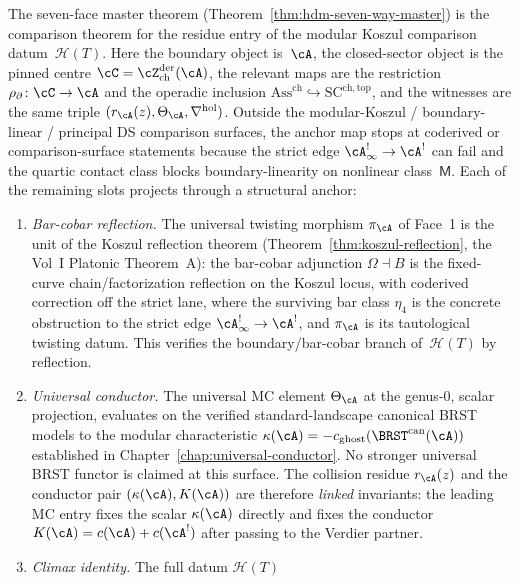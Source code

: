 \begin{remark}
\label{rem:hdm-anchors}
The seven-face master theorem
(Theorem~\ref{thm:hdm-seven-way-master}) is the comparison theorem for
the residue entry of the modular Koszul comparison
datum~$\mathcal{H}(T)$. Here the boundary object is~$\cA$, the
closed-sector object is the pinned centre
$\cC=\cZ^{\mathrm{der}}_{\mathrm{ch}}(\cA)$, the relevant maps are the
restriction $\rho_{\partial}\colon \cC\to\cA$ and the operadic
inclusion $\mathrm{Ass}^{\mathrm{ch}}\hookrightarrow
\mathrm{SC}^{\mathrm{ch,top}}$, and the witnesses are the same triple
$(r_\cA(z),\Theta_\cA,\nabla^{\mathrm{hol}})$. Outside the
modular-Koszul / boundary-linear / principal DS comparison surfaces,
the anchor map stops at coderived or comparison-surface statements
because the strict edge $\cA^{!}_\infty\to\cA^!$ can fail and the
quartic contact class blocks boundary-linearity on nonlinear
class~$\mathsf{M}$. Each of the remaining slots projects through a
structural anchor:
\begin{enumerate}[label=\textup{(W\arabic*)}]
\item \emph{Bar-cobar reflection.} The universal twisting morphism
 $\pi_\cA$ of Face~1 is the unit of the Koszul reflection theorem
 (Theorem~\ref{thm:koszul-reflection}, the Vol~I Platonic
 Theorem~A): the bar-cobar adjunction
 $\Omega \dashv B$ is the fixed-curve chain/factorization
 reflection on the Koszul locus, with coderived correction off the
 strict lane, where the surviving bar class $\eta_4$ is the concrete
 obstruction to the strict edge $\cA^{!}_\infty\to\cA^!$, and
 $\pi_\cA$ is its tautological twisting datum. This verifies the
 boundary/bar-cobar branch of~$\mathcal{H}(T)$ by reflection.
\item \emph{Universal conductor.} The universal MC
 element $\Theta_\cA$ at the genus-$0$, scalar projection,
 evaluates on the verified standard-landscape canonical BRST models to
 the modular characteristic
 $\kappa(\cA) = -c_{\mathrm{ghost}}(\BRST^{\mathrm{can}}(\cA))$
 established in Chapter~\ref{chap:universal-conductor}. No stronger
 universal BRST functor is claimed at this surface. The collision
 residue $r_\cA(z)$ and the conductor pair
 $(\kappa(\cA),K(\cA))$ are therefore \emph{linked} invariants: the
 leading MC entry fixes the scalar $\kappa(\cA)$ directly and
 fixes the conductor $K(\cA)=c(\cA)+c(\cA^!)$ after passing to the
 Verdier partner.
\item \emph{Climax identity.} The full datum $\mathcal{H}(T)$

\end{enumerate}
\end{remark}
